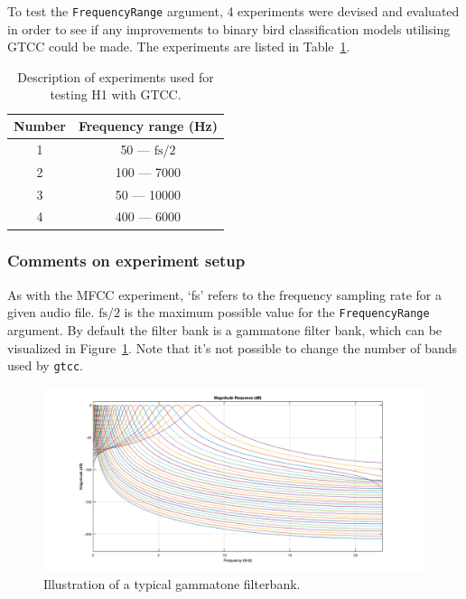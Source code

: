 To test the \texttt{FrequencyRange} argument, 4 experiments were devised and
evaluated in order to see if any improvements to binary bird classification
models utilising GTCC could be made. The experiments are listed in
Table~\ref{table:h1_gtcc_experiments}.

\begin{table}[h!t]
\begin{center}
\begin{tabular}{c c}
\toprule
Number & Frequency range (Hz) \\ [0.5ex]
\midrule
1 & 50 --- $\text{fs}/2$ \\
2 & 100 --- 7000 \\
3 & 50 --- 10000 \\
4 & 400 --- 6000 \\
\bottomrule
\end{tabular}
\caption{Description of experiments used for testing H1 with
GTCC.}\label{table:h1_gtcc_experiments}
\end{center}
\end{table}

\subsubsection{Comments on experiment setup}

As with the MFCC experiment, `fs' refers to the frequency sampling rate for a
given audio file. $\text{fs}/2$ is the maximum possible value for the
\texttt{FrequencyRange} argument. By default the filter bank is a gammatone
filter bank, which can be visualized in Figure~\ref{fig:gammatone_filterbank}.
Note that it's not possible to change the number of bands used by \texttt{gtcc}.

\begin{figure}[ht]
  \centering
  \includegraphics[width=\textwidth]{figures/gammatone_filterbank.png}
  \caption{Illustration of a typical gammatone
  filterbank.}\label{fig:gammatone_filterbank}
\end{figure}

